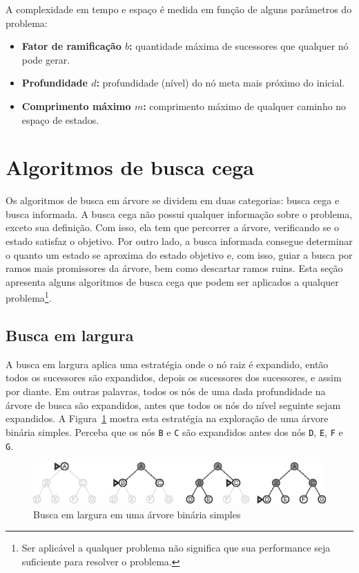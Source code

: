 \insertspace

A complexidade em tempo e espaço é medida em função de alguns parâmetros do problema:
\begin{itemize}
	\item \textbf{Fator de ramificação $b$:} quantidade máxima de sucessores que qualquer nó pode gerar.
	
	\item \textbf{Profundidade $d$:} profundidade (nível) do nó meta mais próximo do inicial.
	
	\item \textbf{Comprimento máximo $m$:} comprimento máximo de qualquer caminho no espaço de estados.
\end{itemize}

\section{Algoritmos de busca cega}
\label{sec:busca-cega}

Os algoritmos de busca em árvore se dividem em duas categorias: busca cega e busca informada. A busca cega não possui qualquer informação sobre o problema, exceto sua definição. Com isso, ela tem que percorrer a árvore, verificando se o estado satisfaz o objetivo. Por outro lado, a busca informada consegue determinar o quanto um estado se aproxima do estado objetivo e, com isso, guiar a busca por ramos mais promissores da árvore, bem como descartar ramos ruins. Esta seção apresenta alguns algoritmos de busca cega que podem ser aplicados a qualquer problema\footnote{Ser aplicável a qualquer problema não significa que sua performance seja suficiente para resolver o problema.}.

\subsection{Busca em largura}

A busca em largura aplica uma estratégia onde o nó raiz é expandido, então todos os sucessores são expandidos, depois os sucessores dos sucessores, e assim por diante. Em outras palavras, todos os nós de uma dada profundidade na árvore de busca são expandidos, antes que todos os nós do nível seguinte sejam expandidos. A Figura~\ref{fig:busca-largura} mostra esta estratégia na exploração de uma árvore binária simples. Perceba que os nós \texttt{B} e \texttt{C} são expandidos antes dos nós \texttt{D}, \texttt{E}, \texttt{F} e \texttt{G}.

\begin{figure}[h]
	\centering
	\includegraphics[width=\textwidth]{img/busca-largura}
	\caption{Busca em largura em uma árvore binária simples}
	\label{fig:busca-largura}
\end{figure}

